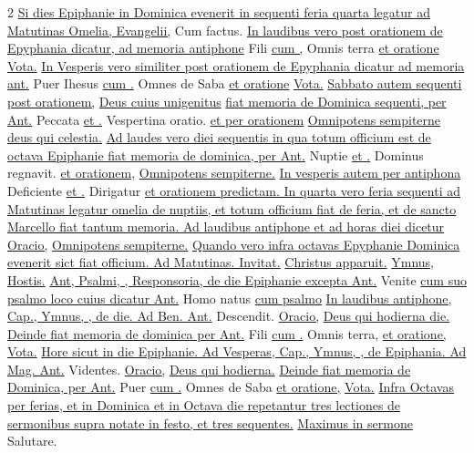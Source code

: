 \begin{multicols*}{2}
\newline \ul{Si dies Epiphanie in Dominica evenerit in sequenti feria quarta legatur ad Matutinas Omelia, Evangelii,} Cum factus. \ul{In laudibus vero post orationem de Epyphania dicatur, ad memoria antiphone} Fili \ul{cum \Vbar ,} Omnis terra \ul{et oratione} \hyperlink{vota-quesumus-epiphanie}{Vota.} \ul{In Vesperis vero similiter post orationem de Epyphania dicatur ad memoria ant.} Puer Ihesus \ul{cum \Vbar .} Omnes de Saba \ul{et oratione} \hyperlink{vota-quesumus-epiphanie}{Vota.} \ul{Sabbato autem sequenti post orationem,} \hyperlink{deus-cuius-unigenitus-epiphanie}{Deus cuius unigenitus} \ul{fiat memoria de Dominica sequenti, per Ant.} Peccata \ul{et \Vbar .} Vespertina oratio. \ul{et per orationem} \hyperlink{omnipotens-sempiterne-dom-i-post}{Omnipotens sempiterne deus qui celestia.} \ul{Ad laudes vero diei sequentis in qua totum officium est de octava Epiphanie fiat memoria de dominica, per Ant.} Nuptie \ul{et \Vbar .} Dominus regnavit. \ul{et orationem,} \hyperlink{omnipotens-sempiterne-dom-i-post}{Omnipotens sempiterne.} \ul{In vesperis autem per antiphona} Deficiente \ul{et \Vbar .} Dirigatur \ul{et orationem predictam. In quarta vero feria sequenti ad Matutinas legatur omelia de nuptiis, et totum officium fiat de feria, et de sancto Marcello fiat tantum memoria. Ad laudibus antiphone et ad horas diei dicetur Oracio,} \hyperlink{omnipotens-sempiterne-dom-i-post}{Omnipotens sempiterne.} \ul{Quando vero infra octavas Epyphanie Dominica evenerit sict fiat officium. Ad Matutinas. Invitat.} \hyperlink{christus-apparuit-invitatorium}{Christus apparuit.} \ul{Ymnus,} \hyperlink{hostis-herodes}{Hostis.} \ul{Ant, Psalmi, \Vbar , Responsoria, de die Epiphanie excepta Ant.} Venite \ul{cum suo psalmo loco cuius dicatur Ant.} Homo natus \ul{cum psalmo}  \ul{In laudibus antiphone, Cap., Ymnus, \Vbar , de die. Ad Ben. Ant.} Descendit. \ul{Oracio,} \hyperlink{deus-qui-hodierna-epiphanie}{Deus qui hodierna die.} \ul{Deinde fiat memoria de dominica per Ant.} Fili \ul{cum \Vbar .} Omnis terra, \ul{et oratione,} \hyperlink{vota-quesumus-epiphanie}{Vota.} \ul{Hore sicut in die Epiphanie. Ad Vesperas, Cap., Ymnus, \Vbar , de Epiphania. Ad Mag. Ant.} Videntes. \ul{Oracio,} \hyperlink{deus-qui-hodierna-epiphanie}{Deus qui hodierna.} \ul{Deinde fiat memoria de Dominica, per Ant.} Puer \ul{cum \Vbar .} Omnes de Saba \ul{et oratione,} \hyperlink{vota-quesumus-epiphanie}{Vota.} \ul{Infra Octavas per ferias, et in Dominica et in Octava die repetantur tres lectiones de sermonibus supra notate in festo, et tres sequentes.}
\newline \ul{Maximus in sermone} Salutare. 

\end{multicols*}
